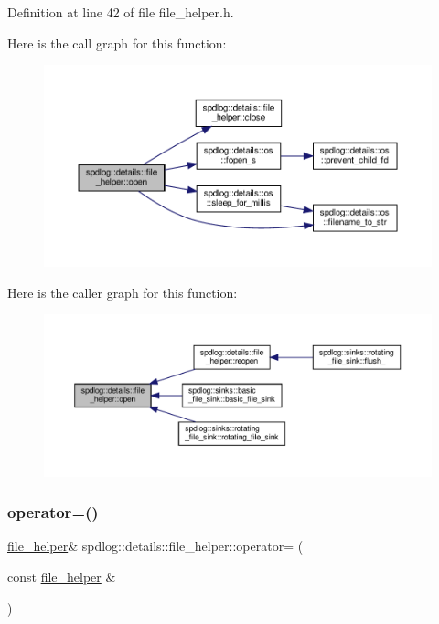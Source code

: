 Definition at line 42 of file file\+\_\+helper.\+h.

Here is the call graph for this function\+:
\nopagebreak
\begin{figure}[H]
\begin{center}
\leavevmode
\includegraphics[width=350pt]{classspdlog_1_1details_1_1file__helper_a8612066fd098080cc60e3aefed6a6085_cgraph}
\end{center}
\end{figure}
Here is the caller graph for this function\+:
\nopagebreak
\begin{figure}[H]
\begin{center}
\leavevmode
\includegraphics[width=350pt]{classspdlog_1_1details_1_1file__helper_a8612066fd098080cc60e3aefed6a6085_icgraph}
\end{center}
\end{figure}
\mbox{\label{classspdlog_1_1details_1_1file__helper_a7c7314360e404efa02326feb7aa98442}} 
\subsubsection{\texorpdfstring{operator=()}{operator=()}}
{\footnotesize\ttfamily \hyperlink{classspdlog_1_1details_1_1file__helper}{file\+\_\+helper}\& spdlog\+::details\+::file\+\_\+helper\+::operator= (\begin{DoxyParamCaption}\item[{const \hyperlink{classspdlog_1_1details_1_1file__helper}{file\+\_\+helper} \&}]{ }\end{DoxyParamCaption})\hspace{0.3cm}{\ttfamily [delete]}}

